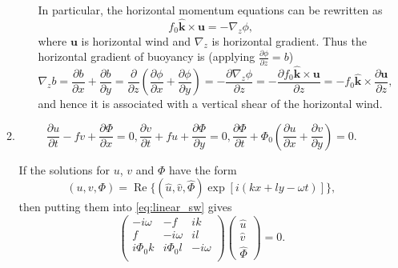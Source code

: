 \documentclass[a4paper]{article}
\begin{document}
\begin{enumerate}[label=\textbf{\arabic*.}]
\begin{enumerate}[label=\textbf{(\alph*)}]
\begin{enumerate}[label=(\roman*)]
				In particular, the horizontal momentum equations can be rewritten as 
				$$ f_{0} \hat { \mathbf{k}} \times \bm u = - \nabla_z \phi,$$
				where $\bm u$ is horizontal wind and $\nabla_z$ is horizontal gradient.
				Thus the horizontal gradient of buoyancy is (applying $\frac{\partial \phi}{\partial z}=b$)
				$$\nabla_z b = \frac{\partial b}{\partial x}+\frac{\partial b}{\partial y}=\frac{\partial }{\partial z}\left(\frac{\partial \phi}{\partial x} +\frac{\partial \phi}{\partial y}\right) = -\frac{\partial \nabla_z \phi}{\partial z}=-\frac{\partial f_{0} \hat { \mathbf{k}} \times \bm u}{\partial z}=-f_{0}\hat {\mathbf{k}} \times \frac{\partial \bm u}{\partial z},$$
				and hence it is associated with a vertical shear of the horizontal wind.
			\end{enumerate}
		\vspace{1cm}
		\item  
			\begin{subequations}\label{eq:linear_sw}
			\begin{equation}
			\frac { \partial u} {\partial t} - fv + \frac{\partial \Phi}{\partial x} = 0,
			\end{equation}	
			\begin{equation}
			\frac { \partial v}{\partial t} + fu + \frac{\partial \Phi} {\partial y} = 0,
			\end{equation}
			\begin{equation}
			\frac { \partial \Phi} {\partial t} + \Phi _ { 0} \left( \frac { \partial u} { \partial x} + \frac { \partial v} { \partial y} \right) = 0.
			\end{equation}
		\end{subequations}
		
		If the solutions for $u$, $v$ and $\Phi$ have the form 
		$$(u,v,\Phi) = \operatorname{Re} \{ (\hat{u},\hat{v},\hat{\Phi} )\exp [i(kx + l y - \omega t)]\}, $$
		then putting them into \eqref{eq:linear_sw} gives
		\begin{equation}\label{eq:matrix}
		\left(
		\begin{matrix}
		-i\omega& -f& ik\\
		f & -i\omega & il\\
		i\Phi_0k & i\Phi_0 l & -i\omega \\
		\end{matrix}
		\right)\left(
		\begin{matrix}
		\hat{u}\\
		\hat{v}\\
		\hat{\Phi}
		\end{matrix}
		\right)=0.
		\end{equation}
	

\end{enumerate}
\end{enumerate}
\end{document}
